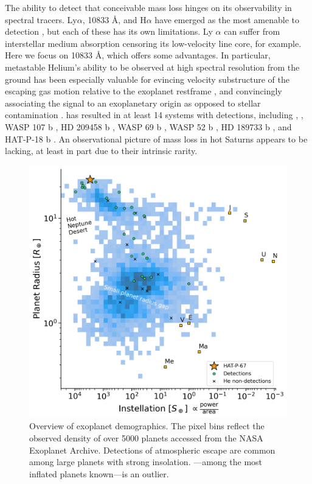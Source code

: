 \documentclass[twocolumn]{aastex631}
\newcommand{\hatpb}{\object{HAT-P-67 b}}
\begin{document}
The ability to detect that conceivable mass loss hinges on its observability in spectral tracers.  Ly$\alpha$,  10833 \AA, and H$\alpha$ have emerged as the most amenable to detection \citep{2018ApJ...855L..11O,2022arXiv221116243D,2023MNRAS.518.4357O}, but each of these has its own limitations.  Ly $\alpha$ can suffer from interstellar medium  absorption censoring its low-velocity line core, for example.  Here we focus on  10833 \AA, which offers some advantages.  In particular, metastable Helium's ability to be observed at high spectral resolution from the ground has been especially valuable for evincing velocity substructure of the escaping gas motion relative to the exoplanet restframe \citep{2019A&A...629A.110A,2020ApJ...894...97N}, and convincingly associating the signal to an exoplanetary origin as opposed to stellar contamination \citep{2018AJ....156..189C}.   has resulted in at least 14 systems with detections, including  \citep{2020ApJ...894...97N, 2021A&A...647A.129L},  \citep{2022AJ....163...68Z}, WASP 107 b \citep{2019A&A...623A..58A,2020AJ....159..115K}, HD 209458 b \citep{2019A&A...629A.110A}, WASP 69 b \citep{2020AJ....159..278V}, WASP 52 b \citep{2020AJ....159..278V}, HD 189733 b \citep{2021A&A...647A.129L}, and HAT-P-18 b \citep{2021ApJ...909L..10P}.  An observational picture of mass loss in hot Saturns appears to be lacking, at least in part due to their intrinsic rarity.

\begin{figure}
    \centering
    \includegraphics[width=\linewidth]{figures/HAT-P-67b_radius_valley.png}
    \caption{Overview of exoplanet demographics.  The pixel bins reflect the observed density of over 5000 planets accessed from the NASA Exoplanet Archive. Detections of atmospheric escape are common among large planets with strong insolation.  \hatpb---among the most inflated planets known---is an outlier.}
    \label{fig:instellation}
\end{figure}
\end{document}
